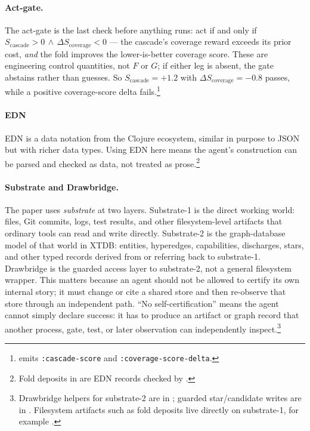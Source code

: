 \paragraph{Act-gate.} The act-gate is the last check before anything runs: act if and only if $S_{\mathrm{cascade}} > 0 \,\wedge\, \Delta S_{\mathrm{coverage}} < 0$ --- the cascade's coverage reward exceeds its prior cost, \emph{and} the fold improves the lower-is-better coverage score.  These are engineering control quantities, not $F$ or $G$; if either leg is absent, the gate abstains rather than guesses.  So $S_{\mathrm{cascade}}=+1.2$ with $\Delta S_{\mathrm{coverage}}=-0.8$ passes, while a positive coverage-score delta fails.\footnote{ emits \texttt{:cascade-score} and \texttt{:coverage-score-delta}.}

\paragraph{EDN} EDN is a data notation from the Clojure ecosystem, similar in purpose to JSON but with richer data types.  Using EDN here means the agent's construction can be parsed and checked as data, not treated as prose.\footnote{Fold deposits in  are EDN records checked by .}

\paragraph{Substrate and Drawbridge.} The paper uses \emph{substrate} at two layers.  Substrate-1 is the direct working world: files, Git commits, logs, test results, and other filesystem-level artifacts that ordinary tools can read and write directly.  Substrate-2 is the graph-database model of that world in XTDB: entities, hyperedges, capabilities, discharges, stars, and other typed records derived from or referring back to substrate-1.  Drawbridge is the guarded access layer to substrate-2, not a general filesystem wrapper.  This matters because an agent should not be allowed to certify its own internal story; it must change or cite a shared store and then re-observe that store through an independent path.  ``No self-certification'' means the agent cannot simply declare success: it has to produce an artifact or graph record that another process, gate, test, or later observation can independently inspect.\footnote{Drawbridge helpers for substrate-2 are in ; guarded star/candidate writes are in . Filesystem artifacts such as fold deposits live directly on substrate-1, for example .}

